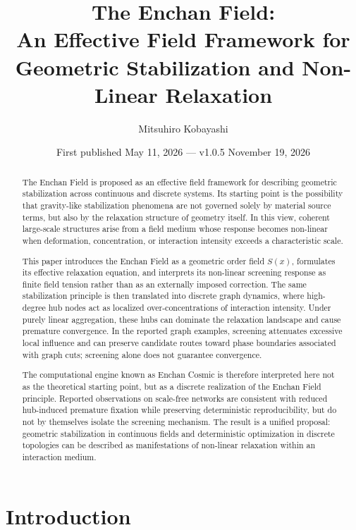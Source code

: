 \documentclass[11pt,a4paper]{article}
\title{\textbf{The Enchan Field:}\\
An Effective Field Framework for Geometric Stabilization and Non-Linear Relaxation}
\author[1]{Mitsuhiro Kobayashi}
\affil[1]{Tokyo, Japan\\
\texttt{enchan.theory@gmail.com}}
\date{First published May 11, 2026 --- v1.0.5 November 19, 2026}
\begin{document}
\maketitle

\begin{abstract}
The Enchan Field is proposed as an effective field framework for describing geometric stabilization across continuous and discrete systems. Its starting point is the possibility that gravity-like stabilization phenomena are not governed solely by material source terms, but also by the relaxation structure of geometry itself. In this view, coherent large-scale structures arise from a field medium whose response becomes non-linear when deformation, concentration, or interaction intensity exceeds a characteristic scale.

This paper introduces the Enchan Field as a geometric order field $S(x)$, formulates its effective relaxation equation, and interprets its non-linear screening response as finite field tension rather than as an externally imposed correction. The same stabilization principle is then translated into discrete graph dynamics, where high-degree hub nodes act as localized over-concentrations of interaction intensity. Under purely linear aggregation, these hubs can dominate the relaxation landscape and cause premature convergence. In the reported graph examples, screening attenuates excessive local influence and can preserve candidate routes toward phase boundaries associated with graph cuts; screening alone does not guarantee convergence.

The computational engine known as Enchan Cosmic is therefore interpreted here not as the theoretical starting point, but as a discrete realization of the Enchan Field principle. Reported observations on scale-free networks are consistent with reduced hub-induced premature fixation while preserving deterministic reproducibility, but do not by themselves isolate the screening mechanism. The result is a unified proposal: geometric stabilization in continuous fields and deterministic optimization in discrete topologies can be described as manifestations of non-linear relaxation within an interaction medium.
\end{abstract}

\tableofcontents

\clearpage

\section{Introduction}
\end{document}
